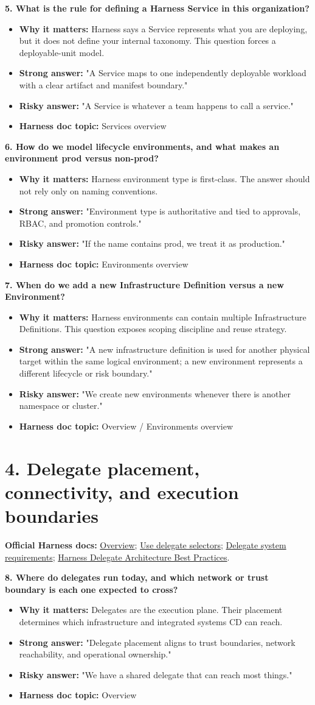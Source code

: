 \documentclass[11pt]{article}
\newcommand{\doccluster}[1]{%
  {\small\textcolor{AccentGray}{\textbf{Official Harness docs:} #1}}\par\vspace{0.4em}
}
\newcommand{\qblock}[5]{%
  \textbf{#1}\par
  \begin{itemize}[leftmargin=1.5em,itemsep=0.2em,topsep=0.3em]
    \item[--] \textbf{Why it matters:} #2
    \item[--] \textbf{Strong answer:} #3
    \item[--] \textbf{Risky answer:} #4
    \item[--] \textbf{Harness doc topic:} #5
  \end{itemize}
  \vspace{0.4em}
}
\begin{document}
\qblock{5. What is the rule for defining a Harness Service in this organization?}{Harness says a Service represents what you are deploying, but it does not define your internal taxonomy. This question forces a deployable-unit model.}{"A Service maps to one independently deployable workload with a clear artifact and manifest boundary."}{"A Service is whatever a team happens to call a service."}{Services overview}

\qblock{6. How do we model lifecycle environments, and what makes an environment prod versus non-prod?}{Harness environment type is first-class. The answer should not rely only on naming conventions.}{"Environment type is authoritative and tied to approvals, RBAC, and promotion controls."}{"If the name contains prod, we treat it as production."}{Environments overview}

\qblock{7. When do we add a new Infrastructure Definition versus a new Environment?}{Harness environments can contain multiple Infrastructure Definitions. This question exposes scoping discipline and reuse strategy.}{"A new infrastructure definition is used for another physical target within the same logical environment; a new environment represents a different lifecycle or risk boundary."}{"We create new environments whenever there is another namespace or cluster."}{Overview / Environments overview}

\section*{4. Delegate placement, connectivity, and execution boundaries}
\doccluster{\href{https://developer.harness.io/docs/platform/delegates/delegate-concepts/delegate-overview/}{Overview}; \href{https://developer.harness.io/docs/platform/delegates/manage-delegates/select-delegates-with-selectors}{Use delegate selectors}; \href{https://developer.harness.io/docs/platform/delegates/delegate-concepts/delegate-requirements}{Delegate system requirements}; \href{https://developer.harness.io/docs/platform/reference-architectures/delegate-architecture-bestpractices}{Harness Delegate Architecture Best Practices}.}

\qblock{8. Where do delegates run today, and which network or trust boundary is each one expected to cross?}{Delegates are the execution plane. Their placement determines which infrastructure and integrated systems CD can reach.}{"Delegate placement aligns to trust boundaries, network reachability, and operational ownership."}{"We have a shared delegate that can reach most things."}{Overview}
\end{document}
